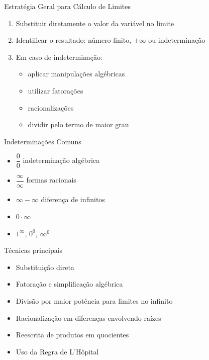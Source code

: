 \documentclass[fleqn,utf8,aspectratio=169,12pt]{beamer}
\begin{document}
\begin{frame}{Estratégia Geral para Cálculo de Limites}
\begin{enumerate}[<+->]
    \item Substituir diretamente o valor da variável no limite
    \item Identificar o resultado: número finito, $\pm\infty$ ou indeterminação
    \item Em caso de indeterminação:
    \begin{itemize}
        \item aplicar manipulações algébricas
        \item utilizar fatorações
        \item racionalizações
        \item dividir pelo termo de maior grau
    \end{itemize}
\end{enumerate}
\end{frame}

\begin{frame}{Indeterminações Comuns}
\begin{itemize}[<+->]
    \setlength{\itemsep}{5mm}
    \item $\dfrac{0}{0}$           \tabto{35mm} indeterminação algébrica
    \item $\dfrac{\infty}{\infty}$ \tabto{35mm} formas racionais
    \item $\infty - \infty$        \tabto{35mm} diferença de infinitos
    \item $0 \cdot \infty$
    \item $1^\infty$,\; $0^0$,\; $\infty^0$
\end{itemize}
\end{frame}







\begin{frame}{Técnicas principais}
\begin{itemize}
  \item Substituição direta
  \item Fatoração e simplificação algébrica
  \item Divisão por maior potência para limites no infinito
  \item Racionalização em diferenças envolvendo raízes
  \item Reescrita de produtos em quocientes
  \item Uso da Regra de L'Hôpital
\end{itemize}
\end{frame}
\end{document}
